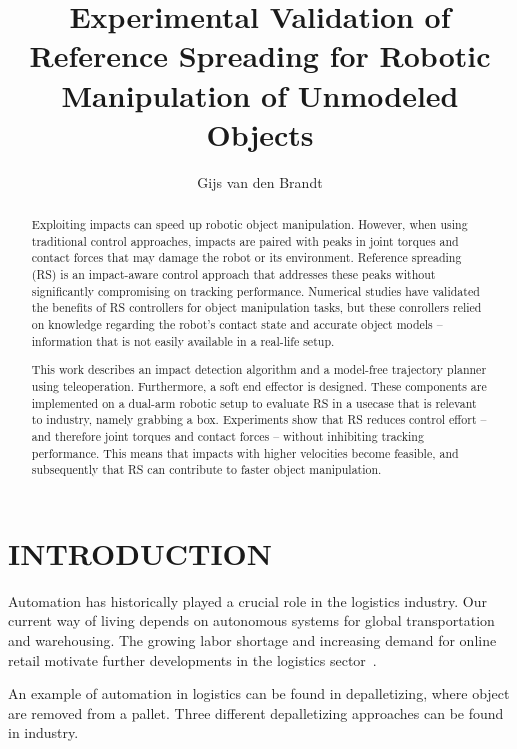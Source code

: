 \documentclass[a4paper, 10pt, conference]{ieeeconf}
\title{\LARGE \bf
    Experimental Validation of Reference Spreading for Robotic Manipulation of Unmodeled Objects
    }
\author{Gijs van den Brandt%
    }
\begin{document}
    \maketitle
    \thispagestyle{empty}
    \pagestyle{empty}

    \begin{abstract}

    Exploiting impacts can speed up robotic object manipulation.  However,  when using traditional control approaches, impacts are paired with peaks in joint torques and contact forces that may damage the robot or its environment. Reference spreading (RS) is an impact-aware control approach that addresses these peaks without significantly compromising on tracking performance. Numerical studies have validated the benefits of RS controllers for object manipulation tasks, but these conrollers relied on knowledge regarding the robot's contact state and accurate object models --  information that is not easily available in a real-life setup. 

    This work describes an impact detection algorithm and a model-free trajectory planner using teleoperation. Furthermore, a soft end effector is designed. These components are implemented on a dual-arm robotic setup to evaluate RS in a usecase that is relevant to industry, namely grabbing a box. Experiments show that RS reduces control effort -- and therefore joint torques and contact forces -- without inhibiting tracking performance. This means that impacts with higher velocities become feasible, and subsequently that RS can contribute to faster object manipulation.

    \end{abstract}

    \section{INTRODUCTION}

    Automation has historically played a crucial role in the logistics industry. Our current way of living depends on autonomous systems for global transportation and warehousing. The growing labor shortage and increasing demand for online retail motivate further developments in the logistics sector~\cite{dekhneAutomationLogisticsBig2019}.

    An example of automation in logistics can be found in depalletizing, where object are removed from a pallet. Three different depalletizing approaches can be found in industry. 
\end{document}
